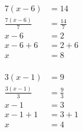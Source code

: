 \documentclass[12pt]{article}
\newcounter{minipagecount}
\begin{document}
\begin{multicols}{2}
\begin{minipage}[t]{0.45\textwidth}
    \raggedright %
    \begin{align*} %
        7(x - 6) &= 14\\
        \frac{7(x-6)}{7} &= \frac{14}{7}\\
        x - 6 &= 2\\
        x - 6 + 6 &= 2 + 6\\
        x &= 8\\
    \end{align*}
\end{minipage}\newpage
\noindent{(\theminipagecount)}\hspace{0.1mm} %
\begin{minipage}[t]{0.45\textwidth} %
    \vspace{-26pt}  %
    \raggedright %
    \begin{align*} %
        3(x - 1) &= 9\\
        \frac{3(x-1)}{3} &= \frac{9}{3}\\
        x - 1 &= 3\\
        x - 1 + 1 &= 3 + 1\\
        x &= 4\\
    \end{align*}
\end{minipage} %
\noindent{(\theminipagecount)}\hspace{0.1mm} %
\begin{minipage}[t]{0.45\textwidth} %
    \vspace{-26pt}  %

\end{minipage}
\end{multicols}
\end{document}
